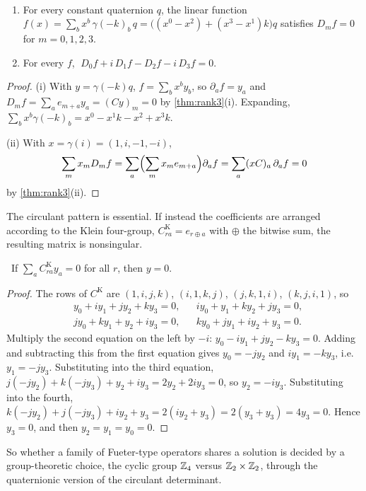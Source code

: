 \begin{corollary}\label{cor:commonsol}\ver\
\begin{enumerate}[label=(\roman*)]
\item For every constant quaternion $q$, the linear function $f(x)=\sum_bx^b\,\gamma(-k)_b\,q=\bigl((x^0-x^2)+(x^3-x^1)k\bigr)q$ satisfies $D_mf=0$ for $m=0,1,2,3$.
\item For every $f$, $\;D_0f+i\,D_1f-D_2f-i\,D_3f=0$.
\end{enumerate}
\end{corollary}
\begin{proof}
(i) With $y=\gamma(-k)q$, $f=\sum_bx^by_b$, so $\partial_af=y_a$ and $D_mf=\sum_ae_{m+a}y_a=(Cy)_m=0$ by \cref{thm:rank3}(i). Expanding, $\sum_bx^b\gamma(-k)_b=x^0-x^1k-x^2+x^3k$.

(ii) With $x=\gamma(i)=(1,i,-1,-i)$,
\[
\sum_mx_mD_mf=\sum_a\Bigl(\sum_mx_me_{m+a}\Bigr)\partial_af=\sum_a(xC)_a\,\partial_af=0
\]
by \cref{thm:rank3}(ii).
\end{proof}


The circulant pattern is essential. If instead the coefficients are arranged according to the Klein four-group, $C^{\mathrm K}_{ra}=e_{r\oplus a}$ with $\oplus$ the bitwise sum, the resulting matrix is nonsingular.

\begin{proposition}[The Klein arrangement is regular]\label{prop:klein}\ver\
If $\sum_aC^{\mathrm K}_{ra}y_a=0$ for all $r$, then $y=0$.
\end{proposition}
\begin{proof}
The rows of $C^{\mathrm K}$ are $(1,i,j,k)$, $(i,1,k,j)$, $(j,k,1,i)$, $(k,j,i,1)$, so
\[
\begin{aligned}
&y_0+iy_1+jy_2+ky_3=0, &&iy_0+y_1+ky_2+jy_3=0,\\
&jy_0+ky_1+y_2+iy_3=0, &&ky_0+jy_1+iy_2+y_3=0 .
\end{aligned}
\]
Multiply the second equation on the left by $-i$: $y_0-iy_1+jy_2-ky_3=0$. Adding and subtracting this from the first equation gives $y_0=-jy_2$ and $iy_1=-ky_3$, i.e.\ $y_1=-jy_3$. Substituting into the third equation, $j(-jy_2)+k(-jy_3)+y_2+iy_3=2y_2+2iy_3=0$, so $y_2=-iy_3$. Substituting into the fourth, $k(-jy_2)+j(-jy_3)+iy_2+y_3=2(iy_2+y_3)=2(y_3+y_3)=4y_3=0$. Hence $y_3=0$, and then $y_2=y_1=y_0=0$.
\end{proof}


So whether a family of Fueter-type operators shares a solution is decided by a group-theoretic choice, the cyclic group $\mathbb{Z}_4$ versus $\mathbb{Z}_2\times\mathbb{Z}_2$, through the quaternionic version of the circulant determinant.

